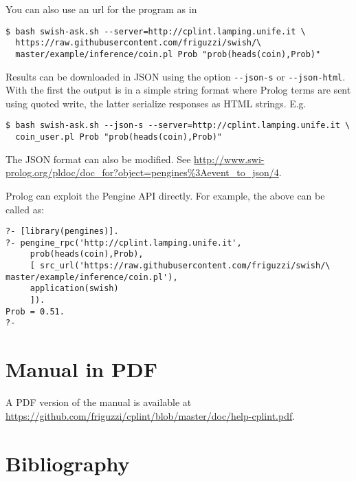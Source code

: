 \documentclass[a4paper,10pt]{scrartcl}
\begin{document}
You can also use an url for the program as in 
\begin{verbatim}
$ bash swish-ask.sh --server=http://cplint.lamping.unife.it \
  https://raw.githubusercontent.com/friguzzi/swish/\  
  master/example/inference/coin.pl Prob "prob(heads(coin),Prob)"
\end{verbatim}
Results can be downloaded in JSON using the option \verb|--json-s| or
\verb|--json-html|.
With the first the output is in a simple string format where Prolog terms are sent using quoted write, the latter serialize responses as HTML strings. E.g.
\begin{verbatim}
$ bash swish-ask.sh --json-s --server=http://cplint.lamping.unife.it \
  coin_user.pl Prob "prob(heads(coin),Prob)"
\end{verbatim}
The JSON format can also be modified. See
\url{http://www.swi-prolog.org/pldoc/doc_for?object=pengines%3Aevent_to_json/4}.

Prolog can exploit the Pengine API directly.  For example, the above can
be called as:
\begin{verbatim}
?- [library(pengines)].
?- pengine_rpc('http://cplint.lamping.unife.it',
     prob(heads(coin),Prob),
     [ src_url('https://raw.githubusercontent.com/friguzzi/swish/\  
master/example/inference/coin.pl'),
     application(swish)
     ]).
Prob = 0.51.
?-
\end{verbatim}

\section{Manual in PDF}
A PDF version of the manual is available at
\url{https://github.com/friguzzi/cplint/blob/master/doc/help-cplint.pdf}.
\section{Bibliography}


\end{document}

